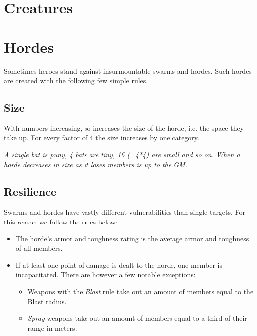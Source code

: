 \documentclass[12pt,a4paper,openany]{book}
\begin{document}
	\vspace{5mm}
	

	\section{Creatures}
	

	\section{Hordes}
	Sometimes heroes stand against insurmountable swarms and hordes. Such hordes are created with the following few simple rules.
	
	\subsection*{Size}
	With numbers increasing, so increases the size of the horde, i.e. the space they take up. For every factor of 4 the size increases by one category.
	\begin{exampleblock}
		\itshape A single bat is puny, 4 bats are tiny, 16 (=4*4) are small and so on. When a horde decreases in size as it loses members is up to the GM.
	\end{exampleblock}
	
	\subsection*{Resilience}
	Swarms and hordes have vastly different vulnerabilities than single targets. For this reason we follow the rules below:
	\begin{itemize}
		\setlength\itemsep{-8mm} \vspace{-8mm}
		\item The horde's armor and toughness rating is the average armor and toughness of all members.
		\item If at least one point of damage is dealt to the horde, one member is incapacitated. There are however a few notable exceptions:
			\begin{itemize}
				\setlength\itemsep{-8mm} \vspace{-8mm}
				\item Weapons with the \emph{Blast} rule take out an amount of members equal to the Blast radius.
				\item \emph{Spray} weapons take out an amount of members equal to a third of their range in meters.
			\end{itemize}
	\end{itemize}
	
\end{document}
